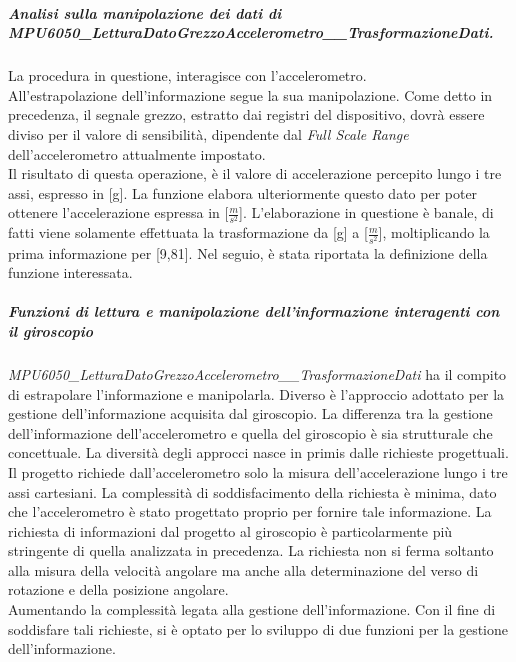 \documentclass[11pt]{report}
\begin{document}
\subparagraph{Analisi sulla manipolazione dei dati di\\MPU6050\_LetturaDatoGrezzoAccelerometro\_\_TrasformazioneDati.}
La procedura in questione, interagisce con l'accelerometro.\\
All'estrapolazione dell'informazione segue la sua manipolazione. Come detto in precedenza, il segnale grezzo, estratto dai registri del dispositivo, dovrà essere diviso per il valore di sensibilità, dipendente dal \textit{Full Scale Range} dell'accelerometro attualmente impostato.\\
Il risultato di questa operazione, è il valore di accelerazione percepito lungo i tre assi, espresso in [g]. La funzione elabora ulteriormente questo dato per poter ottenere l'accelerazione espressa in [$\frac{m}{s^2}$]. L'elaborazione in questione è banale, di fatti viene solamente effettuata la trasformazione da [g] a [$\frac{m}{s^2}$], moltiplicando la prima informazione per [9,81].
Nel seguio, è stata riportata la definizione della funzione interessata.


\subparagraph{Funzioni di lettura e manipolazione dell'informazione interagenti con il giroscopio}
\textit{MPU6050\_LetturaDatoGrezzoAccelerometro\_\_TrasformazioneDati} ha il compito di estrapolare l'informazione e manipolarla. Diverso è l'approccio adottato per la gestione dell'informazione acquisita dal giroscopio.
La differenza tra la gestione dell'informazione dell'accelerometro e quella del giroscopio è sia strutturale che concettuale. La diversità degli approcci nasce in primis dalle richieste progettuali.\\
Il progetto richiede dall'accelerometro solo la misura dell'accelerazione lungo i tre assi cartesiani. La complessità di soddisfacimento della richiesta è minima, dato che l'accelerometro è stato progettato proprio per fornire tale informazione.
La richiesta di informazioni dal progetto al giroscopio è particolarmente più stringente di quella analizzata in precedenza. La richiesta non si ferma soltanto alla misura della velocità angolare ma anche alla determinazione del verso di rotazione e della posizione angolare.\\
Aumentando la complessità legata alla gestione dell'informazione.
Con il fine di soddisfare tali richieste, si è optato per lo sviluppo di due funzioni per la gestione dell'informazione.
\end{document}
